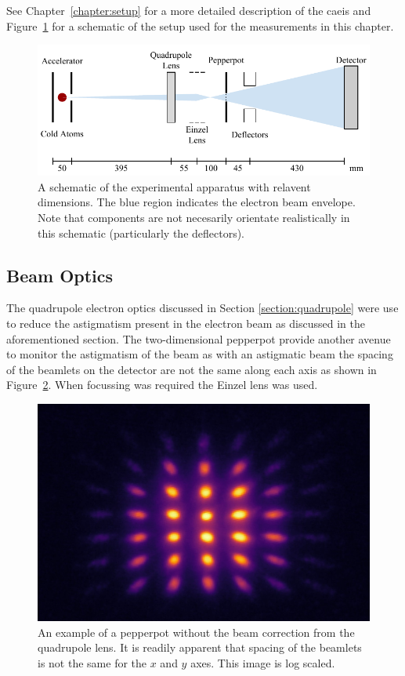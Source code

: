See Chapter~\ref{chapter:setup} for a more detailed description of the \gls{caeis} and Figure~\ref{figure:emittance_schematic} for a schematic of the setup used for the measurements in this chapter.

\begin{figure}
\center
\includegraphics{part2/Figs/EmittanceApparatusSchematic.pdf}
\caption{A schematic of the experimental apparatus with relavent dimensions. The blue region indicates the electron beam envelope. Note that components are not necesarily orientate realistically in this schematic (particularly the deflectors).}
\label{figure:emittance_schematic}
\end{figure}

\subsection{Beam Optics}
The quadrupole electron optics discussed in Section \ref{section:quadrupole} were use to reduce the astigmatism present in the electron beam as discussed in the aforementioned section.
The two-dimensional pepperpot provide another avenue to monitor the astigmatism of the beam as with an astigmatic beam the spacing of the beamlets on the detector are not the same along each axis as shown in Figure~\ref{figure:astigmatic_pepperpot}.
When focussing was required the Einzel lens was used.

\begin{figure}
    \center
    \includegraphics[width=0.5\linewidth]{part2/Figs/example_astigmatic_pepperpot.jpeg}
    \caption{An example of a pepperpot without the beam correction from the quadrupole lens. It is readily apparent that spacing of the beamlets is not the same for the $x$ and $y$ axes. This image is log scaled.}
    \label{figure:astigmatic_pepperpot}
\end{figure}

